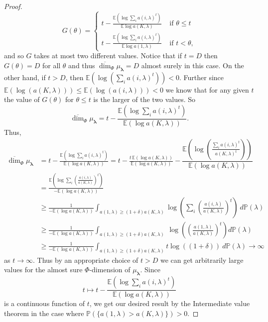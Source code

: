 \documentclass{amsart}
\theoremstyle{plain}
\numberwithin{equation}{section}
\renewcommand{\P}{{\mathbb P}}
\newcommand{\blambda}{{\boldsymbol{\lambda}}}
\newcommand{\ee}{{\mathbb E}}
\newcommand{\odim}{\overline{\dim}}
\begin{document}
\begin{proof}
\begin{equation*}
     G(\theta)=\begin{cases}
             t-\displaystyle\frac{\ee(\log \sum_{i}a(i,\lambda)^{t})}{\ee{\log a(K,\lambda)}} & \text{ if }\theta \leq t \\[10pt]
             t-\displaystyle\frac{\ee(\log \sum_{i}a(i,\lambda)^{t})}{\ee{\log a(1,\lambda)}} & \text{ if }t<\theta,
      \end{cases}
\end{equation*}
and so $G$ takes at most two different values.
Notice that if $t=D$ then $G(\theta)=D$ for all $\theta $ and thus $\odim_{\Phi}\mu_\blambda=D$ almost surely in this case. 
On the other hand, if $t>D$, then $\ee(\log (\sum_{i}a(i,\lambda)^{t}))<0$. 
Further since $\ee(\log (a(K,\lambda))) \le \ee(\log( a(i,\lambda)))<0$ we know that for any given $t$ the value of 
$G(\theta)$ for $\theta \le t$ is the larger of the two values. 
So
\begin{equation*}
    \odim_{\Phi}\mu_\blambda=
   t-\displaystyle\frac{\ee(\log \sum_{i}a(i,\lambda)^{t})}{\ee(\log a(K,\lambda))}.
\end{equation*}
Thus, 
\begin{align*}
   \odim_{\Phi}\mu_\blambda& =t-\frac{\ee(\log \sum_{i}a(i,\lambda)^{t})}{\ee(\log a(K,\lambda))}=
      t-\frac{t\,\ee(\log a(K,\lambda))}{\ee(\log a(K,\lambda))}-
               \dfrac{\ee(\log (\frac{\sum_{i}a(i,\lambda)^{t}}{a(K,\lambda)^t}))}{\ee(\log a(K,\lambda))} \\
%
       & =\frac{\ee(\log \sum_{i}\left( \frac{a(i,\lambda)}{a(K,\lambda)}\right)^{t})}{-\ee(\log a(K,\lambda))}\\
   &\geq \frac{1}{-\ee(\log a(K,\lambda))}
          \int_{a(1,\lambda) \ge (1+\delta) a(K,\lambda)}\log (\sum_{i}\left( \frac{a(i,\lambda)}{a(K,\lambda)}\right)^{t})\ d\P(\lambda) \\
%
         & \ge \frac{1}{-\ee(\log a(K,\lambda))}\int_{a(1,\lambda) \ge (1+\delta) a(K,\lambda)}\ \log(\left( \frac{ a(1,\lambda)}{a(K,\lambda)} \right)^t) d\P(\lambda) \\
         & \ge \frac{1}{-\ee(\log a(K,\lambda))}\int_{a(1,\lambda) \ge (1+\delta) a(K,\lambda)} t \log((1 + \delta))  \ d\P(\lambda) \rightarrow \infty 
\end{align*}%
as $t\rightarrow \infty $. 
Thus by an appropriate choice of $t>D$ we can get arbitrarily large values for the almost sure $\Phi$-dimension of 
$\mu_\blambda$. 
Since 
\begin{equation*}
       t\mapsto t-\displaystyle\frac{\ee(\log \sum_{i}a(i,\lambda)^{t})}{\ee(\log a(K,\lambda))}
\end{equation*}
is a continuous function of $t$, we get our desired result by the
Intermediate value theorem in the case where $\P(\{a(1,\lambda)>a(K,\lambda)\})>0$.


\end{proof}
\end{document}
